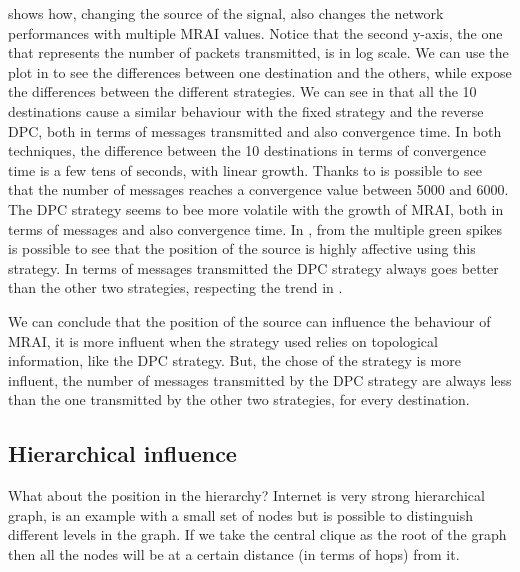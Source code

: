  shows how, changing the source of the signal,
also changes the network performances with multiple \ac{MRAI} values.
Notice that the second y-axis, the one that represents the number of packets
transmitted, is in log scale.
We can use the plot in  to see the
differences between one destination and the others, while 
expose the differences between the different strategies.
We can see in  that all the \num{10} destinations
cause a similar behaviour with the fixed strategy and the reverse \ac{DPC}, both
in terms of messages transmitted and also convergence time.
In both techniques, the difference between the \num{10} destinations in terms of
convergence time is a few tens of seconds, with linear growth.
Thanks to  is possible to see that the
number of messages reaches a convergence value between \num{5000} and
\num{6000}.
The \ac{DPC} strategy seems to bee more volatile with the growth of \ac{MRAI},
both in terms of messages and also convergence time.
In , from the multiple green spikes is possible to see
that the position of the source is highly affective using this strategy.
In terms of messages transmitted the \ac{DPC} strategy always goes better than
the other two strategies, respecting the trend in .

We can conclude that the position of the source can influence the behaviour
of \ac{MRAI}, it is more influent when the strategy used relies on topological
information, like the \ac{DPC} strategy.
But, the chose of the strategy is more influent, the number of messages transmitted
by the \ac{DPC} strategy are always less than the one transmitted by the other
two strategies, for every destination.

\subsection{Hierarchical influence}
\label{subsec:hierarchical_influence}

What about the position in the hierarchy?
Internet is very strong hierarchical graph, 
is an example with a small set of nodes but is possible to distinguish different levels
in the graph.
If we take the central clique as the root of the graph then all the nodes will
be at a certain distance (in terms of hops) from it.

